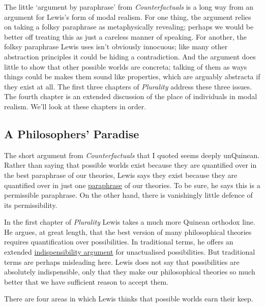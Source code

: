 The little `argument by paraphrase' from \textit{Counterfactuals} is a long way from an argument for Lewis's form of modal realism. For one thing, the argument relies on taking a folksy paraphrase as metaphysically revealing; perhaps we would be better off treating this as just a careless manner of speaking. For another, the folksy paraphrase Lewis uses isn't obviously innocuous; like many other abstraction principles it could be hiding a contradiction. And the argument does little to show that other possible worlds are concreta; talking of them as ways things could be makes them sound like properties, which are arguably abstracta if they exist at all. The first three chapters of \textit{Plurality} address these three issues. The fourth chapter is an extended discussion of the place of individuals in modal realism. We'll look at these chapters in order.

\subsection{A Philosophers' Paradise} 

The short argument from \textit{Counterfactuals} that I quoted seems deeply unQuinean. Rather than saying that possible worlds exist because they are quantified over in the best paraphrase of our theories, Lewis says they exist because they are quantified over in just one \href{http://plato.stanford.edu/nominalism-metaphysics/index.html#NomAboUni}{paraphrase} of our theories. To be sure, he says this is a permissible paraphrase. On the other hand, there is vanishingly little defence of its permissibility.

In the first chapter of \textit{Plurality} Lewis takes a much more Quinean orthodox line. He argues, at great length, that the best version of many philosophical theories requires quantification over possibilities. In traditional terms, he offers an extended \href{http://plato.stanford.edu/mathphil-indis/}{indispensibility argument} for unactualised possibilities. But traditional terms are perhaps misleading here. Lewis does not say that possibilities are absolutely indispensible, only that they make our philosophical theories so much better that we have sufficient reason to accept them.

There are four areas in which Lewis thinks that possible worlds earn their keep.

